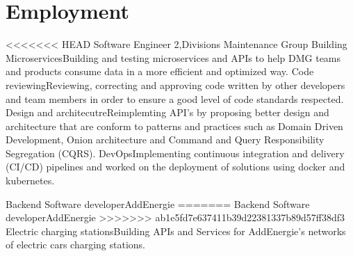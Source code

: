 \section{Employment}
  \resumeSubHeadingListStart
    \resumeSubheading
<<<<<<< HEAD
    {Software Engineer 2,}{Divisions Maintenance Group}{}
    {}
      \resumeItemListStart
        \renewcommand{\labelitemii}{\raisebox{.2cm}{$\bullet$}}
        \resumeItem
        {Building Microservices}{Building and testing microservices and APIs to help DMG teams and products consume data in a more efficient and optimized way.}
        \resumeItem
        {Code reviewing}{Reviewing, correcting and approving code written by other developers and team members in order to ensure a good level of code standards respected.}
        \renewcommand{\labelitemii}{\raisebox{.4cm}{$\bullet$}}
        \resumeItem
        {Design and architecutre}{Reimplemting API's by proposing better design and architecture that are conform to patterns and practices such as Domain Driven Development, Onion architecture and Command and Query Responsibility Segregation (CQRS).}
        \renewcommand{\labelitemii}{\raisebox{.2cm}{$\bullet$}}
        \resumeItem
        {DevOps}{Implementing continuous integration and delivery (CI/CD) pipelines and worked on the deployment of solutions using 
        docker and kubernetes.}
        \renewcommand{\labelitemii}{\scriptsize \raisebox{.25cm}{\ding{118}}}
      \resumeItemListEnd

    \resumeSubheading
    {Backend Software developer}{AddEnergie}{}
    {}
=======
    {Backend Software developer}{AddEnergie}{}
    {}
>>>>>>> ab1e5fd7e637411b39d22381337b89d57ff38df3
      \resumeItemListStart
      \renewcommand{\labelitemii}{\raisebox{.2cm}{$\bullet$}}
        \resumeItem
        {Electric charging stations}{Building APIs and Services for AddEnergie's networks of electric cars charging stations.}
        \renewcommand{\labelitemii}{\scriptsize \raisebox{.25cm}{\ding{118}}}
      \resumeItemListEnd

